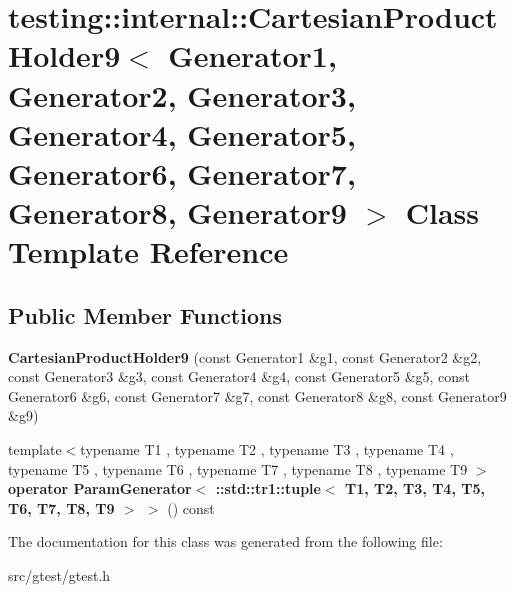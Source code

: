 \hypertarget{classtesting_1_1internal_1_1_cartesian_product_holder9}{}\section{testing\+:\+:internal\+:\+:Cartesian\+Product\+Holder9$<$ Generator1, Generator2, Generator3, Generator4, Generator5, Generator6, Generator7, Generator8, Generator9 $>$ Class Template Reference}
\label{classtesting_1_1internal_1_1_cartesian_product_holder9}
\subsection*{Public Member Functions}
\begin{DoxyCompactItemize}
\item 
\mbox{\label{classtesting_1_1internal_1_1_cartesian_product_holder9_a692a537863ab6adfc4001564887a3bc7}} 
{\bfseries Cartesian\+Product\+Holder9} (const Generator1 \&g1, const Generator2 \&g2, const Generator3 \&g3, const Generator4 \&g4, const Generator5 \&g5, const Generator6 \&g6, const Generator7 \&g7, const Generator8 \&g8, const Generator9 \&g9)
\item 
\mbox{\label{classtesting_1_1internal_1_1_cartesian_product_holder9_ade9334c38ea7729df9b8fd291a820106}} 
{\footnotesize template$<$typename T1 , typename T2 , typename T3 , typename T4 , typename T5 , typename T6 , typename T7 , typename T8 , typename T9 $>$ }\\{\bfseries operator Param\+Generator$<$ \+::std\+::tr1\+::tuple$<$ T1, T2, T3, T4, T5, T6, T7, T8, T9 $>$ $>$} () const
\end{DoxyCompactItemize}


The documentation for this class was generated from the following file\+:\begin{DoxyCompactItemize}
\item 
src/gtest/gtest.\+h\end{DoxyCompactItemize}
